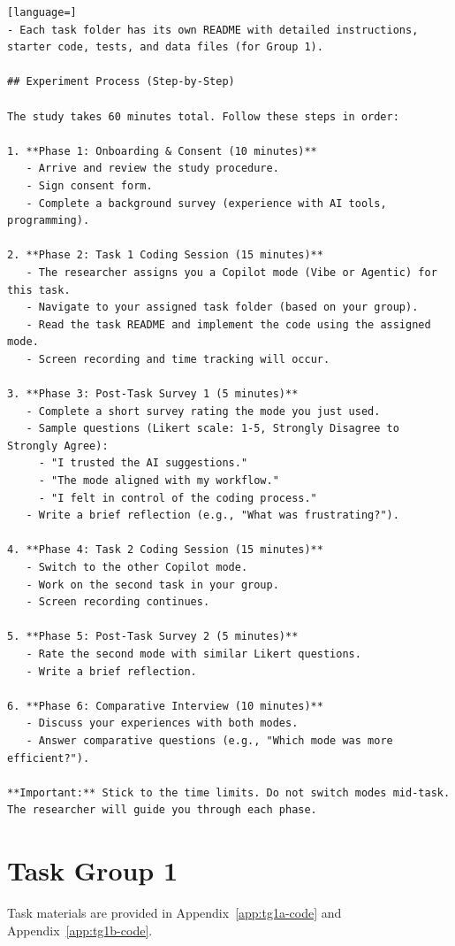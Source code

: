 \begin{appendices}
\begin{lstlisting}[language=]
- Each task folder has its own README with detailed instructions, starter code, tests, and data files (for Group 1).

## Experiment Process (Step-by-Step)

The study takes 60 minutes total. Follow these steps in order:

1. **Phase 1: Onboarding & Consent (10 minutes)**
   - Arrive and review the study procedure.
   - Sign consent form.
   - Complete a background survey (experience with AI tools, programming).

2. **Phase 2: Task 1 Coding Session (15 minutes)**
   - The researcher assigns you a Copilot mode (Vibe or Agentic) for this task.
   - Navigate to your assigned task folder (based on your group).
   - Read the task README and implement the code using the assigned mode.
   - Screen recording and time tracking will occur.

3. **Phase 3: Post-Task Survey 1 (5 minutes)**
   - Complete a short survey rating the mode you just used.
   - Sample questions (Likert scale: 1-5, Strongly Disagree to Strongly Agree):
     - "I trusted the AI suggestions."
     - "The mode aligned with my workflow."
     - "I felt in control of the coding process."
   - Write a brief reflection (e.g., "What was frustrating?").

4. **Phase 4: Task 2 Coding Session (15 minutes)**
   - Switch to the other Copilot mode.
   - Work on the second task in your group.
   - Screen recording continues.

5. **Phase 5: Post-Task Survey 2 (5 minutes)**
   - Rate the second mode with similar Likert questions.
   - Write a brief reflection.

6. **Phase 6: Comparative Interview (10 minutes)**
   - Discuss your experiences with both modes.
   - Answer comparative questions (e.g., "Which mode was more efficient?").

**Important:** Stick to the time limits. Do not switch modes mid-task. The researcher will guide you through each phase.

\end{lstlisting}
\section{Task Group 1}
Task materials are provided in Appendix~\ref{app:tg1a-code} and Appendix~\ref{app:tg1b-code}.


\end{appendices}
